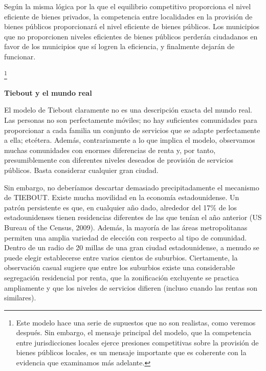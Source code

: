 \documentclass[10pt,a4paper]{article}
\begin{document}
Según la misma lógica por la que el equilibrio competitivo proporciona el nivel eficiente de bienes privados, la competencia entre localidades en la provisión de bienes públicos proporcionará el nivel eficiente de bienes públicos. Los municipios que no proporcionen niveles eficientes de bienes públicos perderán ciudadanos en favor de los municipios que sí logren la eficiencia, y finalmente dejarán de funcionar.


\footnote{%
    Este modelo hace una serie de supuestos que no son realistas, como veremos después. Sin embargo, el mensaje principal del modelo, que la competencia entre jurisdicciones locales ejerce presiones competitivas sobre la provisión de bienes públicos locales, es un mensaje importante que es coherente con la evidencia que examinamos más adelante.
} 









\textbf{Tiebout y el mundo real}

El modelo de Tiebout claramente no es una descripción exacta del mundo real. Las personas no son perfectamente móviles; no hay suficientes comunidades para proporcionar a cada familia un conjunto de servicios que se adapte perfectamente a ella; etcétera. Además, contrariamente a lo que implica el modelo, observamos muchas comunidades con enormes diferencias de renta y, por tanto, presumiblemente con diferentes niveles deseados de provisión de servicios públicos. Basta considerar cualquier gran ciudad.

Sin embargo, no deberíamos descartar demasiado precipitadamente el mecanismo de TIEBOUT. Existe mucha movilidad en la economía estadounidense. Un patrón persistente es que, en cualquier año dado, alrededor del 17\% de los estadounidenses tienen residencias diferentes de las que tenían el año anterior (US Bureau of the Census, 2009). Además, la mayoría de las áreas metropolitanas permiten una amplia variedad de elección con respecto al tipo de comunidad. Dentro de un radio de 20 millas de una gran ciudad estadounidense, a menudo se puede elegir establecerse entre varios cientos de suburbios. Ciertamente, la observación casual sugiere que entre los suburbios existe una considerable segregación residencial por renta, que la zonificación excluyente se practica ampliamente y que los niveles de servicios difieren (incluso cuando las rentas son similares).
\end{document}

